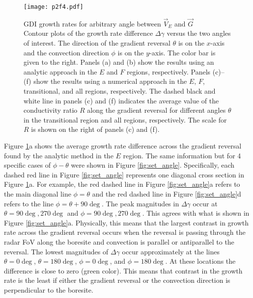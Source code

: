\begin{figure}
	\centering
	\texttt{[image: p2f4.pdf]}
	\caption[GDI growth rates for arbitrary angle between \(\vec{V}_E\) and \(\vec{G}\)]{{\:}GDI growth rates for arbitrary angle between \(\vec{V}_E\) and \(\vec{G}\)\\ Contour plots of the growth rate difference \(\Delta\gamma\)  versus the two angles of interest. The direction of the gradient reversal \(\theta\) is on the \(x\)-axis and the convection direction \(\phi\) is on the \(y\)-axis.  The color bar is given to the right. Panels (a) and (b) show the results using an analytic approach in the \(E\) and \(F\) regions, respectively.  Panels (c)--(f) show the results using a numerical approach in the \(E\), \(F\), transitional, and all regions, respectively. The dashed black and white line in panels (c) and (f) indicates the average value of the conductivity ratio \(R\) along the gradient reversal for different angles \(\theta\) in the transitional region and all regions, respectively. The scale for \(R\) is shown on the right of panels (c) and (f).}
	\label{fig:any_angle}
\end{figure}

Figure \ref{fig:any_angle}a shows the average growth rate difference across the gradient reversal found by the analytic method in the \(E\) region.  The same information but for 4 specific cases of \(\phi-\theta\) were shown in Figure \ref{fig:set_angle}.  Specifically, each dashed red line in Figure \ref{fig:set_angle} represents one diagonal cross section in Figure \ref{fig:any_angle}a. For example, the red dashed line in Figure \ref{fig:set_angle}a refers to the main diagonal line \(\phi=\theta\) and the red dashed line in Figure \ref{fig:set_angle}d refers to the line \(\phi=\theta+90\deg\). The peak magnitudes in \(\Delta\gamma\) occur at \(\theta=90\deg,270\deg\) and \(\phi=90\deg,270\deg\).  This agrees with what is shown in Figure \ref{fig:set_angle}a. Physically, this means that the largest contrast in growth rate across the gradient reversal occurs when the reversal is passing through the radar FoV along the boresite and convection is parallel or antiparallel to the reversal. The lowest magnitudes of \(\Delta\gamma\) occur approximately at the lines \(\theta=0\deg\), \(\theta=180\deg\), \(\phi=0\deg\), and \(\phi=180\deg\). At these locations the difference is close to zero (green color). This means that contrast in the growth rate is the least if either the gradient reversal or the convection direction is perpendicular to the boresite.

